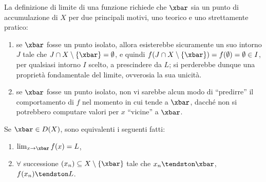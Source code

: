 \documentclass[11pt]{article}
\begin{document}
	\begin{remark} La definizione di limite di una funzione richiede che $\xbar$ sia un punto di
		accumulazione di $X$ per due principali motivi, uno teorico e uno strettamente pratico:
		
		\begin{enumerate}
			\item se $\xbar$ fosse un punto isolato, allora esisterebbe sicuramente un suo intorno $J$ tale
			che $J \cap X \setminus \{\xbar\} = \emptyset$, e quindi $f(J \cap X \setminus \{\xbar\}) = f(\emptyset) = \emptyset \in I$, per qualsiasi intorno $I$ scelto, a prescindere da $L$; si
			perderebbe dunque una proprietà fondamentale del limite, ovverosia la sua unicità.
			\item se $\xbar$ fosse un punto isolato, non vi sarebbe alcun modo di ``predirre'' il
			comportamento di $f$ nel momento in cui tende a $\xbar$, dacché non si potrebbero
			computare valori per $x$ ``vicine'' a $\xbar$.
		\end{enumerate}
		
	\end{remark}
	
	\begin{proposition}
		Se $\xbar \in D(X)$, sono equivalenti i seguenti fatti:
		
		\begin{enumerate}
			\item $\lim_{x \to \xbar} f(x) = L$,
			\item $\forall$ successione $(x_n) \subseteq X \setminus \{\xbar\}$ tale che
			$x_n \tendston \xbar$, $f(x_n) \tendston L$.
		\end{enumerate}
	\end{proposition}
	
\end{document}

